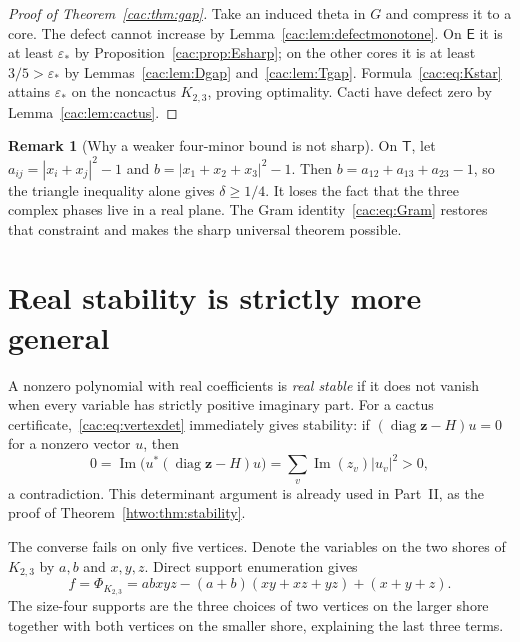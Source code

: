 \documentclass[11pt]{article}
\numberwithin{equation}{section}
\theoremstyle{definition}
\newtheorem{remark}[theorem]{Remark}
\newcommand{\diag}{\operatorname{diag}}
\newcommand{\epsstar}{\varepsilon_*}
\newcommand{\Ecore}{\mathsf E}\newcommand{\Dcore}{\mathsf D}\newcommand{\Tcore}{\mathsf T}
\newcommand{\zv}{\mathbf z}
\begin{document}
\begin{proof}[Proof of Theorem~\ref{cac:thm:gap}]
Take an induced theta in $G$ and compress it to a core. The defect cannot increase by Lemma~\ref{cac:lem:defectmonotone}. On $\Ecore$ it is at least $\epsstar$ by Proposition~\ref{cac:prop:Esharp}; on the other cores it is at least $3/5>\epsstar$ by Lemmas~\ref{cac:lem:Dgap} and~\ref{cac:lem:Tgap}. Formula~\eqref{cac:eq:Kstar} attains $\epsstar$ on the noncactus $K_{2,3}$, proving optimality. Cacti have defect zero by Lemma~\ref{cac:lem:cactus}.
\end{proof}

\begin{remark}[Why a weaker four-minor bound is not sharp]
On $\Tcore$, let $a_{ij}=|x_i+x_j|^2-1$ and $b=|x_1+x_2+x_3|^2-1$. Then $b=a_{12}+a_{13}+a_{23}-1$, so the triangle inequality alone gives $\delta\ge1/4$. It loses the fact that the three complex phases live in a real plane. The Gram identity~\eqref{cac:eq:Gram} restores that constraint and makes the sharp universal theorem possible.
\end{remark}

\section{Real stability is strictly more general}
\label{cac:sec:stable}

A nonzero polynomial with real coefficients is \emph{real stable} if it does not vanish when every variable has strictly positive imaginary part. For a cactus certificate,~\eqref{cac:eq:vertexdet} immediately gives stability: if $(\diag\zv-H)u=0$ for a nonzero vector $u$, then
\[
 0=\operatorname{Im}\bigl(u^*(\diag\zv-H)u\bigr)
   =\sum_v\operatorname{Im}(z_v)|u_v|^2>0,
\]
a contradiction. This determinant argument is already used in Part~II, as the proof of Theorem~\ref{htwo:thm:stability}.

The converse fails on only five vertices. Denote the variables on the two shores of $K_{2,3}$ by $a,b$ and $x,y,z$. Direct support enumeration gives
\begin{equation}
 f=\Phi_{K_{2,3}}
   =abxyz-(a+b)(xy+xz+yz)+(x+y+z).
 \label{cac:eq:stablepoly}
\end{equation}
The size-four supports are the three choices of two vertices on the larger shore together with both vertices on the smaller shore, explaining the last three terms.
\end{document}
